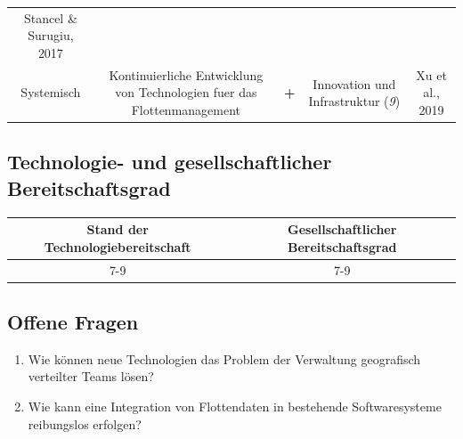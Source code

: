 \documentclass[
]{book}
\providecommand{\tightlist}{%
  \setlength{\itemsep}{0pt}\setlength{\parskip}{0pt}}
\begin{document}
\begin{longtable}[]{@{}ccccc@{}}
\begin{minipage}[t]{0.17\columnwidth}
Stancel \& Surugiu, 2017\strut
\end{minipage}\tabularnewline
\begin{minipage}[t]{0.17\columnwidth}\centering
Systemisch\strut
\end{minipage} & \begin{minipage}[t]{0.16\columnwidth}\centering
Kontinuierliche Entwicklung von Technologien fuer das Flottenmanagement\strut
\end{minipage} & \begin{minipage}[t]{0.17\columnwidth}\centering
\textbf{+}\strut
\end{minipage} & \begin{minipage}[t]{0.17\columnwidth}\centering
Innovation und Infrastruktur (\emph{9})\strut
\end{minipage} & \begin{minipage}[t]{0.17\columnwidth}\centering
Xu et al., 2019\strut
\end{minipage}\tabularnewline
\bottomrule
\end{longtable}

\hypertarget{technologie--und-gesellschaftlicher-bereitschaftsgrad-14}{%
\subsection*{Technologie- und gesellschaftlicher Bereitschaftsgrad}\label{technologie--und-gesellschaftlicher-bereitschaftsgrad-14}}

\begin{longtable}[]{@{}cc@{}}
\toprule
Stand der Technologiebereitschaft & Gesellschaftlicher Bereitschaftsgrad\tabularnewline
\midrule
\endhead
7-9 & 7-9\tabularnewline
\bottomrule
\end{longtable}

\hypertarget{offene-fragen-16}{%
\subsection*{Offene Fragen}\label{offene-fragen-16}}

\begin{enumerate}
\def\labelenumi{\arabic{enumi}.}
\tightlist
\item
  Wie können neue Technologien das Problem der Verwaltung geografisch verteilter Teams lösen?
\item
  Wie kann eine Integration von Flottendaten in bestehende Softwaresysteme reibungslos erfolgen?
\end{enumerate}
\end{document}
